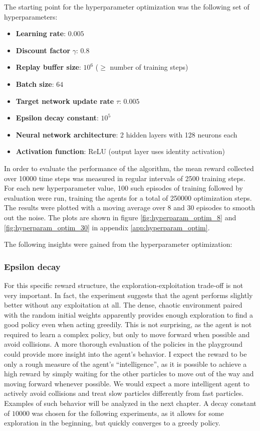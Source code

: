 The starting point for the hyperparameter optimization was the following set of hyperparameters:
\begin{itemize}
    \item \textbf{Learning rate}: $0.005$
    \item \textbf{Discount factor} $\gamma$: $0.8$
    \item \textbf{Replay buffer size}: $10^6$ ($\geq$ number of training steps)
    \item \textbf{Batch size}: $64$
    \item \textbf{Target network update rate} $\tau$: $0.005$
    \item \textbf{Epsilon decay constant}: $10^5$ 
    \item \textbf{Neural network architecture}: 2 hidden layers with 128 neurons each
    \item \textbf{Activation function}: ReLU (output layer uses identity activation)
\end{itemize}
In order to evaluate the performance of the algorithm, the mean reward collected over 10000 time steps was measured in regular intervals of 2500 training steps. For each new hyperparameter value, 100 such episodes of training followed by evaluation were run, training the agents for a total of 250000 optimization steps. The results were plotted with a moving average over 8 and 30 episodes to smooth out the noise. The plots are shown in figure \ref{fig:hyperparam_optim_8} and \ref{fig:hyperparam_optim_30} in appendix \ref{app:hyperparam_optim}.


The following insights were gained from the hyperparameter optimization:
\subsubsection{Epsilon decay}
For this specific reward structure, the exploration-exploitation trade-off is not very important. In fact, the experiment suggests that the agent performs slightly better without any exploitation at all. The dense, chaotic environment paired with the random initial weights apparently provides enough exploration to find a good policy even when acting greedily. This is not surprising, as the agent is not required to learn a complex policy, but only to move forward when possible and avoid collisions. A more thorough evaluation of the policies in the playground could provide more insight into the agent's behavior. I expect the reward to be only a rough measure of the agent's \enquote{intelligence}, as it is possible to achieve a high reward by simply waiting for the other particles to move out of the way and moving forward whenever possible. We would expect a more intelligent agent to actively avoid collisions and treat slow particles differently from fast particles. Examples of such behavior will be analyzed in the next chapter. A decay constant of $10000$ was chosen for the following experiments, as it allows for some exploration in the beginning, but quickly converges to a greedy policy.


